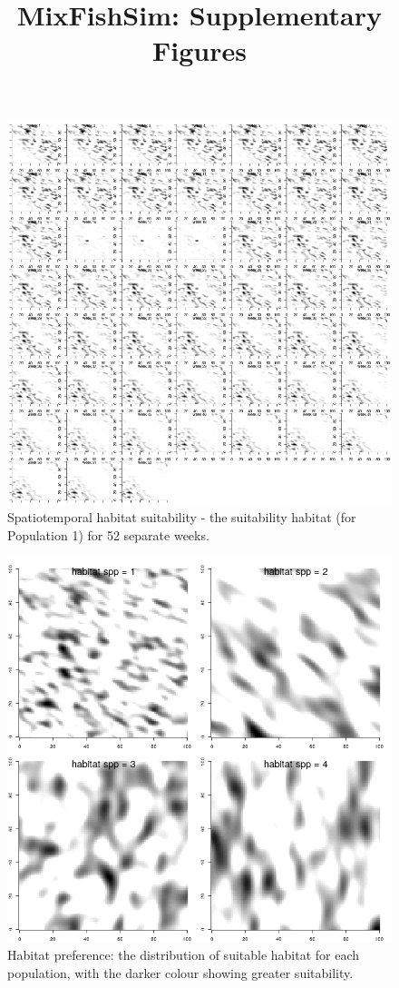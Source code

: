 \documentclass[review]{elsarticle}
\title{MixFishSim: Supplementary Figures}
\newcommand{\beginsupplement}{%
		        \setcounter{table}{0}
		        \renewcommand{\thetable}{S\arabic{table}}%
		        \setcounter{figure}{0}
		        \renewcommand{\thefigure}{S\arabic{figure}}%
			     }
\begin{document}
\beginsupplement
\maketitle

\begin{figure}[!ht]
	\includegraphics[width = \linewidth]{Plots/habitat_spatiotemp_spp_1}
	\caption{Spatiotemporal habitat suitability - the suitability habitat
		(for Population 1) for 52 separate weeks.}
	\label{fig:5}
\end{figure}

\begin{figure}[!ht]
	\includegraphics[width = \linewidth]{../analysis/habitat}
	\caption{Habitat preference: the distribution of suitable habitat for
		each population, with the darker colour showing greater
		suitability.}
	\label{fig:1}
\end{figure}	
\end{document}
